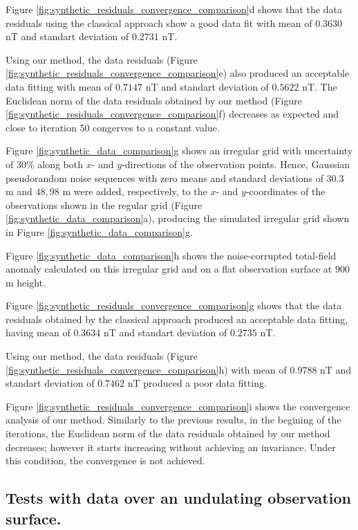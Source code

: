 Figure \ref{fig:synthetic_residuals_convergence_comparison}d shows that the data residuals using the classical approach show a good data fit with mean of $0.3630$ nT and standart deviation of $0.2731$ nT. 

Using our method, the data residuals (Figure \ref{fig:synthetic_residuals_convergence_comparison}e)  also produced an acceptable data fitting with mean of  $0.7147$ nT and standart deviation of $0.5622$ nT. 
The  Euclidean norm of the data residuals obtained by our method 
(Figure \ref{fig:synthetic_residuals_convergence_comparison}f) decreases as expected and close to iteration 50 congerves to a constant value. 



Figure \ref{fig:synthetic_data_comparison}g shows an irregular grid with uncertainty  of $30\%$ along both $x$- and $y$-directions of the observation points.
Hence, Gaussian pseudorandom noise sequences with zero means and standard deviations of 
$30.3$ m and $48,98$ m were added, respectively, to the $x$- and $y$-coordinates of the observations shown in the regular grid (Figure \ref{fig:synthetic_data_comparison}a), producing the simulated irregular grid shown in Figure \ref{fig:synthetic_data_comparison}g.


Figure \ref{fig:synthetic_data_comparison}h shows the noise-corrupted total-field anomaly calculated on this irregular grid and on a flat observation surface at $900$ m height.

 
Figure \ref{fig:synthetic_residuals_convergence_comparison}g shows that the data residuals obtained by the classical approach produced an acceptable data fitting, having mean of $0.3634$ nT and standart deviation of $0.2735$ nT. 

Using our method, the data residuals (Figure \ref{fig:synthetic_residuals_convergence_comparison}h) with mean of $0.9788$ nT and standart deviation of $0.7462$ nT produced a poor data fitting.

Figure \ref{fig:synthetic_residuals_convergence_comparison}i shows the convergence analysis of our method.
Similarly to the previous results, in the begining of the iterations, the Euclidean norm of the data residuals obtained by our method decreases; however it starts increasing without achieving an invariance.
Under this condition, the convergence is not achieved. 


\subsection*{Tests with data over an undulating observation surface.}

